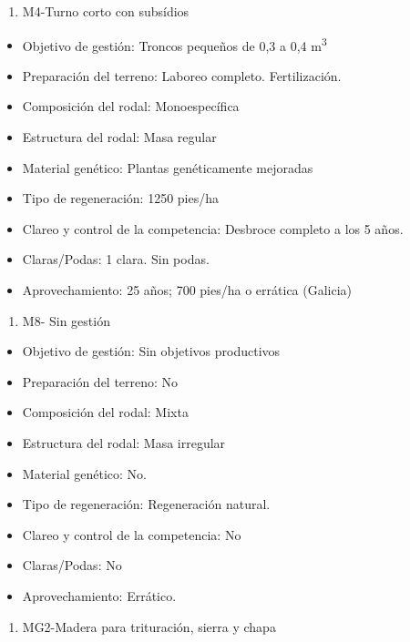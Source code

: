 \documentclass[]{article}
\providecommand{\tightlist}{%
  \setlength{\itemsep}{0pt}\setlength{\parskip}{0pt}}
\begin{document}
\begin{enumerate}
\def\labelenumi{\arabic{enumi}.}
\setcounter{enumi}{1}
\tightlist
\item
  M4-Turno corto con subsídios
\end{enumerate}

\begin{itemize}
\tightlist
\item
  Objetivo de gestión: Troncos pequeños de 0,3 a 0,4
  m\textsuperscript{3}
\item
  Preparación del terreno: Laboreo completo. Fertilización.
\item
  Composición del rodal: Monoespecífica
\item
  Estructura del rodal: Masa regular
\item
  Material genético: Plantas genéticamente mejoradas
\item
  Tipo de regeneración: 1250 pies/ha
\item
  Clareo y control de la competencia: Desbroce completo a los 5 años.
\item
  Claras/Podas: 1 clara. Sin podas.
\item
  Aprovechamiento: 25 años; 700 pies/ha o errática (Galicia)
\end{itemize}

\begin{enumerate}
\def\labelenumi{\arabic{enumi}.}
\setcounter{enumi}{2}
\tightlist
\item
  M8- Sin gestión
\end{enumerate}

\begin{itemize}
\tightlist
\item
  Objetivo de gestión: Sin objetivos productivos
\item
  Preparación del terreno: No
\item
  Composición del rodal: Mixta
\item
  Estructura del rodal: Masa irregular
\item
  Material genético: No.
\item
  Tipo de regeneración: Regeneración natural.
\item
  Clareo y control de la competencia: No
\item
  Claras/Podas: No
\item
  Aprovechamiento: Errático.
\end{itemize}

\begin{enumerate}
\def\labelenumi{\arabic{enumi}.}
\setcounter{enumi}{3}
\tightlist
\item
  MG2-Madera para trituración, sierra y chapa
\end{enumerate}
\end{document}

